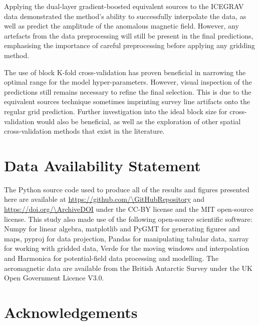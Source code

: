Applying the dual-layer gradient-boosted equivalent sources to the ICEGRAV data demonstrated the method’s ability to successfully interpolate the data, as well as predict the amplitude of the anomalous magnetic field. However, any artefacts from the data preprocessing will still be present in the final predictions, emphasising the importance of careful preprocessing before applying any gridding method.

The use of block K-fold cross-validation has proven beneficial in narrowing the optimal range for the model hyper-parameters. However, visual inspection of the predictions still remains necessary to refine the final selection. This is due to the equivalent sources technique sometimes imprinting survey line artifacts onto the regular grid prediction. Further investigation into the ideal block size for cross-validation would also be beneficial, as well as the exploration of other spatial cross-validation methods that exist in the literature.



\section{Data Availability Statement}

The Python source code used to produce all of the results and figures presented here are available at \url{https://github.com/\GitHubRepository} and
\url{https://doi.org/\ArchiveDOI} under the CC-BY license and the MIT open-source license. This study also made use of the following open-source scientific software: Numpy \citep{numpy} for linear algebra, matplotlib \citep{matplotlib} and PyGMT \citep{pygmt} for generating figures and maps, pyproj \citep{pyproj} for data projection, Pandas \citep{pandas} for manipulating tabular data, xarray \citep{xarray} for working with gridded data, Verde \citep{verde} for the moving windows and interpolation and Harmonica \citep{harmonica} for potential-field data processing and modelling. The aeromagnetic data are available from the British Antarctic Survey \citep{ICEGRAV_data} under the UK Open Government Licence V3.0.

\section{Acknowledgements}

